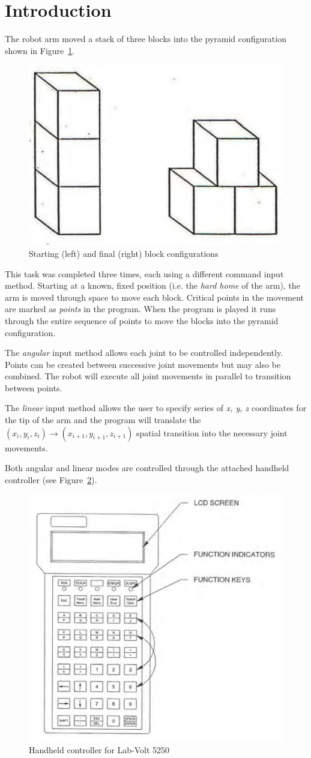 \section{Introduction}\label{sec:intro}
The robot arm moved a stack of three blocks into the pyramid configuration shown in Figure~\ref{fig:blocks}.

\begin{figure}[tbph]
  \centering
  \includegraphics[width=0.4\linewidth]{graphics/blocks}
  \caption{Starting (left) and final (right) block configurations}
  \label{fig:blocks}
\end{figure}

This task was completed three times, each using a different command input method.
Starting at a known, fixed position (i.e. the \textit{hard home} of the arm), the arm is moved through space to move each block.
Critical points in the movement are marked as \textit{points} in the program.
When the program is played it runs through the entire sequence of points to move the blocks into the pyramid configuration.

The \textit{angular} input method allows each joint to be controlled independently.
Points can be created between successive joint movements but may also be combined.
The robot will execute all joint movements in parallel to transition between points.

The \textit{linear} input method allows the user to specify series of \textit{x, y, z} coordinates for the tip of the arm and the program will translate the $(x_i, y_i, z_i) \rightarrow (x_{i+1}, y_{i+1}, z_{i+1})$ spatial transition into the necessary joint movements.

Both angular and linear modes are controlled through the attached handheld controller (see Figure~\ref{fig:handheld}).

\begin{figure}[tbph]
  \centering
  \includegraphics[width=0.4\linewidth]{graphics/handheld}
  \caption{Handheld controller for Lab-Volt 5250}
  \label{fig:handheld}
\end{figure}


